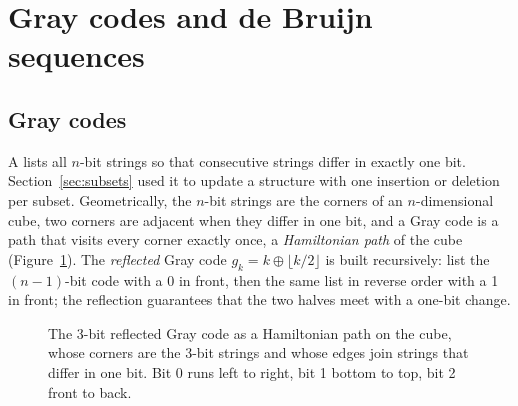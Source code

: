 \section[Gray codes and de Bruijn sequences]{Gray codes and de Bruijn sequences \hfill \gold}\label{sec:debruijn}

\subsection{Gray codes}

A  lists all $n$-bit strings so that consecutive strings differ in exactly one bit. Section~\ref{sec:subsets}
used it to update a structure with one insertion or deletion per subset. Geometrically, the $n$-bit strings are the corners of
an $n$-dimensional cube, two corners are adjacent when they differ in one bit, and a Gray code is a path that visits every
corner exactly once, a \emph{Hamiltonian path} of the cube (Figure~\ref{fig:graycube}). The \emph{reflected} Gray code
$g_k = k \oplus \lfloor k/2\rfloor$ is built recursively: list the $(n-1)$-bit code with a 0 in front, then the same list in
reverse order with a 1 in front; the reflection guarantees that the two halves meet with a one-bit change.

\begin{figure}[htbp]
\centering
{}
\caption{The 3-bit reflected Gray code as a Hamiltonian path on the cube, whose corners are the 3-bit strings and whose edges
join strings that differ in one bit. Bit 0 runs left to right, bit 1 bottom to top, bit 2 front to back.}
\label{fig:graycube}
\end{figure}

